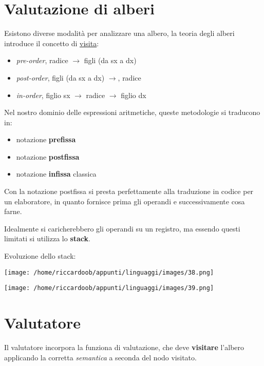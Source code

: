 \section{Valutazione di alberi}
Esistono diverse modalità per analizzare una albero, la teoria degli alberi introduce il concetto di \underline{visita}:
\begin{itemize}
    \item \textit{pre-order}, radice $\rightarrow$ figli (da sx a dx)
    \item \textit{post-order}, figli (da sx a dx) $\rightarrow$, radice
    \item \textit{in-order}, figlio sx $\rightarrow$ radice $\rightarrow$ figlio dx
\end{itemize}

Nel nostro dominio delle espressioni aritmetiche, queste metodologie si traducono in:
\begin{itemize}
    \item notazione \textbf{prefissa}
    \item notazione \textbf{postfissa}
    \item notazione \textbf{infissa} classica
\end{itemize}

Con la notazione postfissa si presta perfettamente alla traduzione in codice per un elaboratore, in quanto fornisce prima gli operandi e successivamente cosa farne.

Idealmente si caricherebbero gli operandi su un registro, ma essendo questi limitati si utilizza lo \textbf{stack}.

Evoluzione dello stack:
\begin{multicols}{2}
    \begin{multicolfigure}
        \centering
        \texttt{[image: /home/riccardoob/appunti/linguaggi/images/38.png]}
    \end{multicolfigure}
    
    \begin{multicolfigure}
        \centering
        \texttt{[image: /home/riccardoob/appunti/linguaggi/images/39.png]}
    \end{multicolfigure}
\end{multicols}

\section{Valutatore}
Il valutatore incorpora la funziona di valutazione, che deve \textbf{visitare} l'albero applicando la corretta \textit{semantica} a seconda del nodo visitato.

